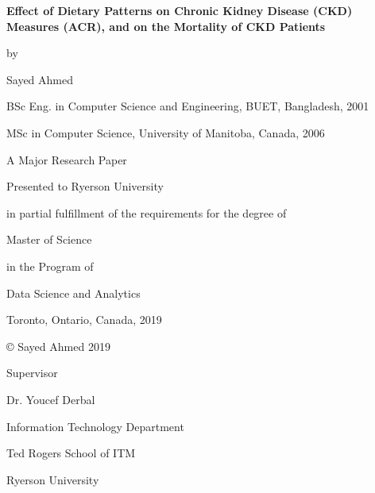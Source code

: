 \thispagestyle{empty}

\begin{center}

\textbf{Effect of Dietary Patterns on Chronic Kidney Disease (CKD) Measures (ACR), and on the Mortality of CKD Patients}
\vspace{0.75cm}


by
\vspace{0.75cm}



Sayed Ahmed

BSc Eng. in Computer Science and Engineering, BUET, Bangladesh, 2001

MSc in Computer Science, University of Manitoba, Canada, 2006

\vspace{0.75cm}
A Major Research Paper

Presented to Ryerson University

in partial fulfillment of the requirements for the degree of

\vspace{0.75cm}
Master of Science

in the Program of

Data Science and Analytics

\vspace{0.75cm}
Toronto, Ontario, Canada, 2019

\vspace{0.75cm}
© Sayed Ahmed 2019

\vspace{0.75cm}

Supervisor

Dr. Youcef Derbal

Information Technology Department

Ted Rogers School of ITM

Ryerson University

\end{center}

